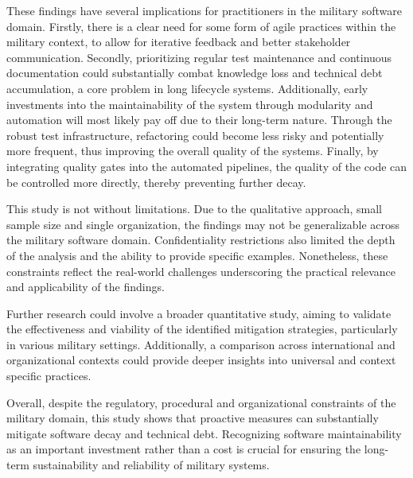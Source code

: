 These findings have several implications for practitioners in the military software domain. Firstly, there is a clear need for some form of agile practices within the military context, to allow for iterative feedback and better stakeholder communication.
Secondly, prioritizing regular test maintenance and continuous documentation could substantially combat knowledge loss and technical debt accumulation, a core problem in long lifecycle systems.
Additionally, early investments into the maintainability of the system through modularity and automation will most likely pay off due to their long-term nature.
Through the robust test infrastructure, refactoring could become less risky and potentially more frequent, thus improving the overall quality of the systems.
Finally, by integrating quality gates into the automated pipelines, the quality of the code can be controlled more directly, thereby preventing further decay.

This study is not without limitations. Due to the qualitative approach, small sample size and single organization, the findings may not be generalizable across the military software domain. Confidentiality restrictions also limited the depth of the analysis and the ability to provide specific examples.
Nonetheless, these constraints reflect the real-world challenges underscoring the practical relevance and applicability of the findings.

Further research could involve a broader quantitative study, aiming to validate the effectiveness and viability of the identified mitigation strategies, particularly in various military settings.
Additionally, a comparison across international and organizational contexts could provide deeper insights into universal and context specific practices.

Overall, despite the regulatory, procedural and organizational constraints of the military domain, this study shows that proactive measures can substantially mitigate software decay and technical debt.
Recognizing software maintainability as an important investment rather than a cost is crucial for ensuring the long-term sustainability and reliability of military systems.
